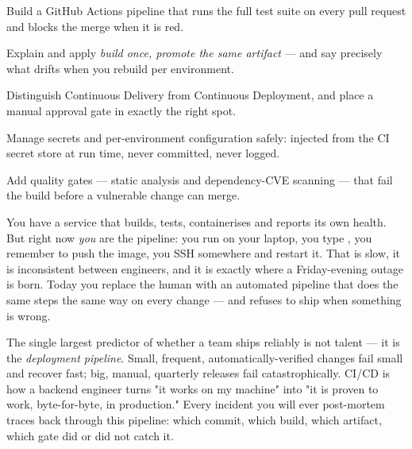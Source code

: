 
\begin{objectives}
\begin{wbitem}
  \item Build a GitHub Actions pipeline that runs the full test suite on every pull request and blocks the merge when it is red.
  \item Explain and apply \emph{build once, promote the same artifact} --- and say precisely what drifts when you rebuild per environment.
  \item Distinguish Continuous Delivery from Continuous Deployment, and place a manual approval gate in exactly the right spot.
  \item Manage secrets and per-environment configuration safely: injected from the CI secret store at run time, never committed, never logged.
  \item Add quality gates --- static analysis and dependency-CVE scanning --- that fail the build before a vulnerable change can merge.
\end{wbitem}
\end{objectives}


 You have a service that builds, tests, containerises and reports its own health. But right now \emph{you} are the pipeline: you run  on your laptop, you type , you remember to push the image, you SSH somewhere and restart it. That is slow, it is inconsistent between engineers, and it is exactly where a Friday-evening outage is born. Today you replace the human with an automated pipeline that does the same steps the same way on every change --- and refuses to ship when something is wrong.

 The single largest predictor of whether a team ships reliably is not talent --- it is the \emph{deployment pipeline}. Small, frequent, automatically-verified changes fail small and recover fast; big, manual, quarterly releases fail catastrophically. CI/CD is how a backend engineer turns "it works on my machine" into "it is proven to work, byte-for-byte, in production." Every incident you will ever post-mortem traces back through this pipeline: which commit, which build, which artifact, which gate did or did not catch it.

